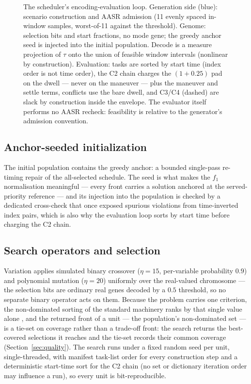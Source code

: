 \documentclass[preprint,authoryear]{elsarticle}
\begin{document}
\begin{figure}[t]
\centering

\caption{The scheduler's encoding-evaluation loop. Generation side (blue): scenario construction and AASR admission (11 evenly spaced in-window samples, worst-of-11 against the threshold). Genome: selection bits and start fractions, no mode gene; the greedy anchor seed is injected into the initial population. Decode is a measure projection of $\tau$ onto the union of feasible window intervals (nonlinear by construction). Evaluation: tasks are sorted by start time (index order is not time order), the C2 chain charges the $(1+0.25)$ pad on the dwell --- never on the maneuver --- plus the maneuver and settle terms, conflicts use the bare dwell, and C3/C4 (dashed) are slack by construction inside the envelope. The evaluator itself performs no AASR recheck: feasibility is relative to the generator's admission convention.}
\label{fig:loop}
\end{figure}

\subsection{Anchor-seeded initialization}

The initial population contains the greedy anchor: a bounded single-pass re-timing repair of the all-selected schedule. The seed is what makes the $f_1$ normalisation meaningful --- every front carries a solution anchored at the served-priority reference --- and its injection into the population is checked by a dedicated cross-check that once exposed spurious violations from time-inverted index pairs, which is also why the evaluation loop sorts by start time before charging the C2 chain.

\subsection{Search operators and selection}

Variation applies simulated binary crossover ($\eta=15$, per-variable probability $0.9$) and polynomial mutation ($\eta=20$) uniformly over the real-valued chromosome --- the selection bits are ordinary real genes decoded by a $0.5$ threshold, so no separate binary operator acts on them. Because the problem carries one criterion, the non-dominated sorting of the standard machinery ranks by that single value alone \citep{deb2002a}, and the returned front of a unit --- the population's non-dominated set --- is a tie-set on coverage rather than a trade-off front: the search returns the best-covered selections it reaches and the tie-set records their common coverage (Section~\ref{sec:quality}). The search runs under a fixed random seed per unit, single-threaded, with manifest task-list order for every construction step and a deterministic start-time sort for the C2 chain (no set or dictionary iteration order may influence a run), so every unit is bit-reproducible.
\end{document}
